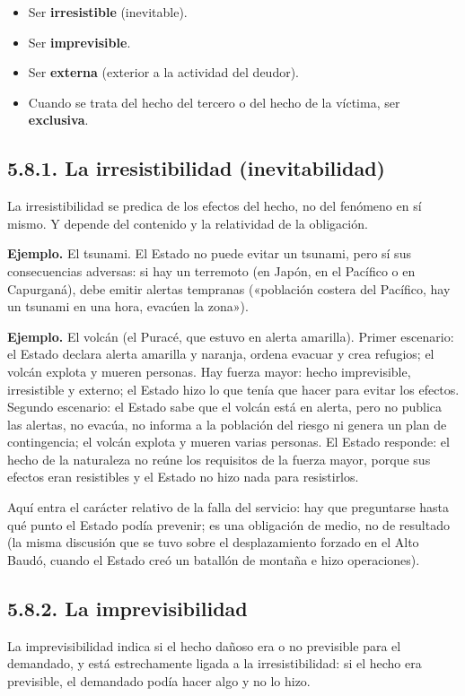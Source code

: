 \begin{itemize}
\item Ser \textbf{irresistible} (inevitable).
\item Ser \textbf{imprevisible}.
\item Ser \textbf{externa} (exterior a la actividad del deudor).
\item Cuando se trata del hecho del tercero o del hecho de la víctima, ser \textbf{exclusiva}.
\end{itemize}
\subsection{5.8.1. La irresistibilidad (inevitabilidad)}
La irresistibilidad se predica de los efectos del hecho, no del fenómeno en sí mismo. Y depende del contenido y la relatividad de la obligación.

\begin{ejemplo}
\textcolor[HTML]{4F6228}{\textbf{Ejemplo. }}El tsunami. El Estado no puede evitar un tsunami, pero sí sus consecuencias adversas: si hay un terremoto (en Japón, en el Pacífico o en Capurganá), debe emitir alertas tempranas («población costera del Pacífico, hay un tsunami en una hora, evacúen la zona»).
\par
\textcolor[HTML]{4F6228}{\textbf{Ejemplo. }}El volcán (el Puracé, que estuvo en alerta amarilla). Primer escenario: el Estado declara alerta amarilla y naranja, ordena evacuar y crea refugios; el volcán explota y mueren personas. Hay fuerza mayor: hecho imprevisible, irresistible y externo; el Estado hizo lo que tenía que hacer para evitar los efectos. Segundo escenario: el Estado sabe que el volcán está en alerta, pero no publica las alertas, no evacúa, no informa a la población del riesgo ni genera un plan de contingencia; el volcán explota y mueren varias personas. El Estado responde: el hecho de la naturaleza no reúne los requisitos de la fuerza mayor, porque sus efectos eran resistibles y el Estado no hizo nada para resistirlos.
\end{ejemplo}
Aquí entra el carácter relativo de la falla del servicio: hay que preguntarse hasta qué punto el Estado podía prevenir; es una obligación de medio, no de resultado (la misma discusión que se tuvo sobre el desplazamiento forzado en el Alto Baudó, cuando el Estado creó un batallón de montaña e hizo operaciones).

\subsection{5.8.2. La imprevisibilidad}
La imprevisibilidad indica si el hecho dañoso era o no previsible para el demandado, y está estrechamente ligada a la irresistibilidad: si el hecho era previsible, el demandado podía hacer algo y no lo hizo.

